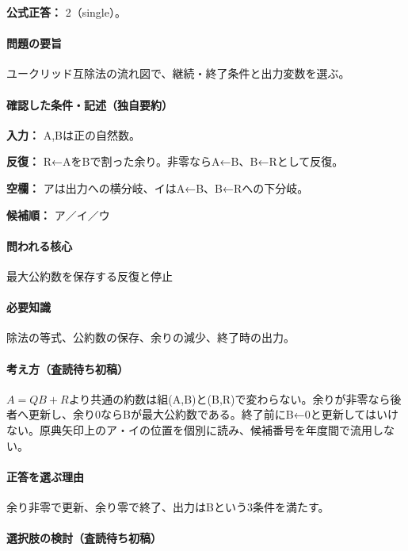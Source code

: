 \textbf{公式正答：} 2（single）。

\paragraph{問題の要旨} ユークリッド互除法の流れ図で、継続・終了条件と出力変数を選ぶ。

\paragraph{確認した条件・記述（独自要約）}\mbox{}\par

\noindent\textbf{入力：} A,Bは正の自然数。\par

\noindent\textbf{反復：} R←AをBで割った余り。非零ならA←B、B←Rとして反復。\par

\noindent\textbf{空欄：} アは出力への横分岐、イはA←B、B←Rへの下分岐。\par

\noindent\textbf{候補順：} ア／イ／ウ\par

\paragraph{問われる核心} 最大公約数を保存する反復と停止

\paragraph{必要知識} 除法の等式、公約数の保存、余りの減少、終了時の出力。

\paragraph{考え方（査読待ち初稿）} \(A=QB+R\)より共通の約数は組(A,B)と(B,R)で変わらない。余りが非零なら後者へ更新し、余り0ならBが最大公約数である。終了前にB←0と更新してはいけない。原典矢印上のア・イの位置を個別に読み、候補番号を年度間で流用しない。

\paragraph{正答を選ぶ理由} 余り非零で更新、余り零で終了、出力はBという3条件を満たす。

\paragraph{選択肢の検討（査読待ち初稿）}\mbox{}\par

